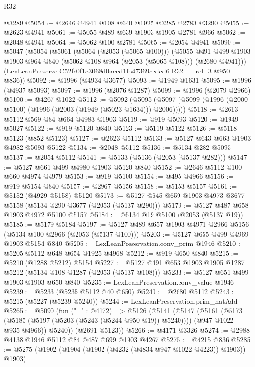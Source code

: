 \begin{lexlean}{R32}
\begin{coremodule}
    @3289
@5054 := @2646 @4941 @108 @640 @1925 @3285 @2783 @3290
@5055 := @2623 @4941
@5061 := @5055 @489 @639 @1903 @1905 @2781 @966
@5062 := @2048 @4941
@5064 := @5062 @100 @2781
@5065 := @2054 @4941
@5090 := @5047
    (@5054
      (@5061
        (@5064 (@2053 (@5065 @100)))
        (@5055
          @491
          @499
          @1903
          @1903
          @964
          @840
          (@5062 @108 @964 (@2053 (@5065 @108)))
          (@2680 @4941)))
      (LexLeanPreserve.C52fc0f1c3068d0aced1fb47369ccdcd6.R32.__rel_3 @950 @836))
@5092 := @1996 (@4934 @3677)
@5093 := @1949 @1631
@5095 := @1996 (@4937 @5093)
@5097 := @1996 (@2076 @1287)
@5099 := @1996 (@2079 @2966)
@5100 := @4267 @1022
@5112 := @5092
    (@5095 (@5097 (@5099 (@1996 (@2000 @5100) (@1996 (@2003 (@1949 (@5023 @1634))) @2006)))))
@5118 := @2613 @5112 @569 @84 @664 @4983 @1903
@5119 := @919 @5093
@5120 := @1949 @5027
@5122 := @919 @5120 @840
@5123 := @5119 @5122
@5126 := @5118 @5123 (@852 @5123)
@5127 := @2623 @5112
@5133 := @5127 @643 @663 @1903 @4982 @5093 @5122
@5134 := @2048 @5112
@5136 := @5134 @282 @5093
@5137 := @2054 @5112
@5141 := @5133 (@5136 (@2053 (@5137 @282)))
@5147 := @5127 @661 @499 @4980 @1903 @5120 @840
@5152 := @2646 @5112 @100 @660 @4974 @4979
@5153 := @919 @5100
@5154 := @495 @4966
@5156 := @919 @5154 @840
@5157 := @2967 @5156
@5158 := @5153 @5157
@5161 := @5152 (@4929 @5158) @5120
@5173 := @5127 @645 @659 @1903 @4973 @3677 @5158 (@5134 @290 @3677 (@2053 (@5137 @290)))
@5179 := @5127 @487 @658 @1903 @4972 @5100 @5157
@5184 := @5134 @19 @5100 (@2053 (@5137 @19))
@5185 := @5179 @5184
@5197 := @5127 @489 @657 @1903 @4971 @2966 @5156 (@5134 @100 @2966 (@2053 (@5137 @100)))
@5203 := @5127 @655 @499 @4969 @1903 @5154 @840
@5205 := LexLeanPreservation.conv_prim @1946
@5210 := @5205 @5112 @648 @654 @1925 @4968
@5212 := @919 @650 @840
@5215 := @5210 (@1288 @5212) @5154
@5227 := @5127 @491 @653 @1903 @1905 @1287 @5212 (@5134 @108 @1287 (@2053 (@5137 @108)))
@5233 := @5127 @651 @499 @1903 @1903 @650 @840
@5235 := LexLeanPreservation.conv_value @1946
@5239 := @5233 (@5235 @5112 @40 @650)
@5240 := @2680 @5112
@5243 := @5215 (@5227 (@5239 @5240))
@5244 := LexLeanPreservation.prim_natAdd
@5265 := @5090
    (fun ("_" : @4172) =>
    @5126
      (@5141
        (@5147
          (@5161
            (@5173 (@5185 (@5197 (@5203 (@5243 (@5244 @950 @19)) @5240))))
            (@947 @1022 @935 @4966))
          @5240))
      (@2691 @5123))
@5266 := @4171 @3326
@5274 := @2988 @4138 @1946 @5112 @84 @487 @699 @1903 @4267
@5275 := @4215 @836
@5285 := @5275 (@1902 (@1904 (@1902 (@4232 (@4834 @947 @1022 @4223)) @1903)) @1903)

\end{coremodule}
\end{lexlean}
